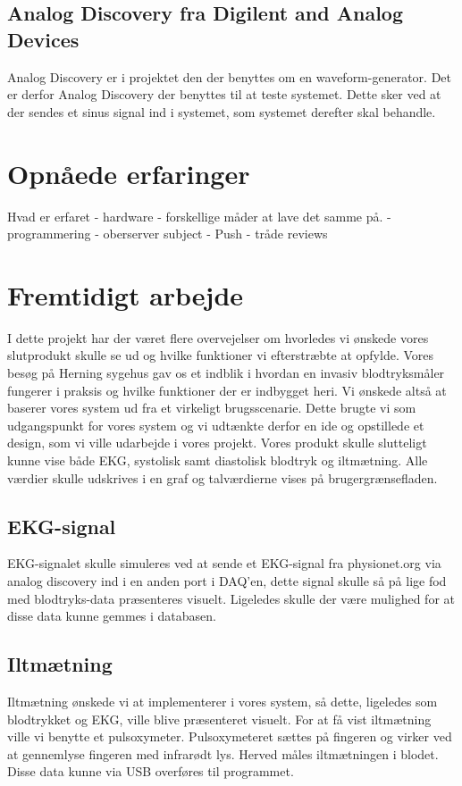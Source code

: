 \subsection{Analog Discovery fra Digilent and Analog Devices}
Analog Discovery er i projektet den der benyttes om en waveform-generator. Det er derfor Analog Discovery der benyttes til at teste systemet. Dette sker ved at der sendes et sinus signal ind i systemet, som systemet derefter skal behandle.
\section{Opnåede erfaringer}
Hvad er erfaret
 - hardware
 	- forskellige måder at lave det samme på.
 - programmering
 	- oberserver subject
 	- Push
 	- tråde
reviews
\section{Fremtidigt arbejde}
I dette projekt har der været flere overvejelser om hvorledes vi ønskede vores slutprodukt skulle se ud og hvilke funktioner vi efterstræbte at opfylde. Vores besøg på Herning sygehus gav os et indblik i hvordan en invasiv blodtryksmåler fungerer i praksis og hvilke funktioner der er indbygget heri. Vi ønskede altså at baserer vores system ud fra et virkeligt brugsscenarie. Dette brugte vi som udgangspunkt for vores system og vi udtænkte derfor en ide og opstillede et design, som vi ville udarbejde i vores projekt. Vores produkt skulle slutteligt kunne vise både EKG, systolisk samt diastolisk blodtryk og iltmætning. Alle værdier skulle udskrives i en graf og talværdierne vises på brugergrænsefladen. 
\subsection{EKG-signal}
EKG-signalet skulle  simuleres ved at sende et EKG-signal fra physionet.org via analog discovery ind i en anden port i DAQ’en, dette signal skulle så på lige fod med blodtryks-data præsenteres visuelt. Ligeledes skulle der være mulighed for at disse data kunne gemmes i databasen.
\subsection{Iltmætning}
Iltmætning ønskede vi at implementerer i vores system, så dette, ligeledes som blodtrykket og EKG, ville blive præsenteret visuelt. For at få vist iltmætning ville vi benytte et pulsoxymeter. Pulsoxymeteret sættes på fingeren og virker ved at gennemlyse fingeren med infrarødt lys. Herved måles iltmætningen i blodet. Disse data kunne via USB overføres til programmet. 
